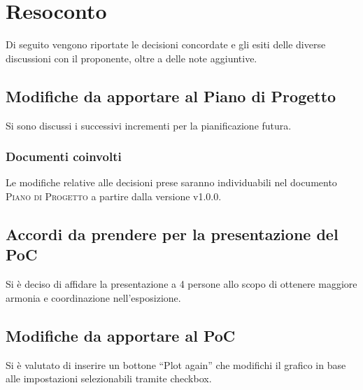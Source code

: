 \documentclass{article}
\begin{document}
\section{Resoconto}
\label{sec:resoconto}

Di seguito vengono riportate le decisioni concordate e gli esiti delle diverse discussioni con il proponente, oltre a 
delle note aggiuntive.

\subsection{Modifiche da apportare al Piano di Progetto}
\label{itm:1}

Si sono discussi i successivi incrementi per la pianificazione futura.

\subsubsection*{Documenti coinvolti}
Le modifiche relative alle decisioni prese saranno individuabili nel documento \textsc{Piano di Progetto} a partire 
dalla versione v1.0.0.

\subsection{Accordi da prendere per la presentazione del PoC}
\label{itm:2}

Si è deciso di affidare la presentazione a 4 persone allo scopo di ottenere maggiore armonia e coordinazione nell'esposizione.

\subsection{Modifiche da apportare al PoC}
\label{itm:3}

Si è valutato di inserire un bottone “Plot again” che modifichi il grafico in base alle impostazioni selezionabili tramite checkbox.
\end{document}
